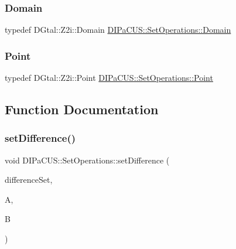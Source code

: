 \mbox{\label{namespaceDIPaCUS_1_1SetOperations_adf150e3c3201e8eb8b65d3d03b63df69}} 
\subsubsection{\texorpdfstring{Domain}{Domain}}
{\footnotesize\ttfamily typedef D\+Gtal\+::\+Z2i\+::\+Domain \hyperlink{namespaceDIPaCUS_1_1SetOperations_adf150e3c3201e8eb8b65d3d03b63df69}{D\+I\+Pa\+C\+U\+S\+::\+Set\+Operations\+::\+Domain}}

\mbox{\label{namespaceDIPaCUS_1_1SetOperations_aef7c8778c0d7fe3bb3d34608fdef58cc}} 
\subsubsection{\texorpdfstring{Point}{Point}}
{\footnotesize\ttfamily typedef D\+Gtal\+::\+Z2i\+::\+Point \hyperlink{namespaceDIPaCUS_1_1SetOperations_aef7c8778c0d7fe3bb3d34608fdef58cc}{D\+I\+Pa\+C\+U\+S\+::\+Set\+Operations\+::\+Point}}



\subsection{Function Documentation}
\mbox{\label{namespaceDIPaCUS_1_1SetOperations_a1ac3bb89ed9eb839006dd5f4af4a2353}} 
\subsubsection{\texorpdfstring{set\+Difference()}{setDifference()}}
{\footnotesize\ttfamily void D\+I\+Pa\+C\+U\+S\+::\+Set\+Operations\+::set\+Difference (\begin{DoxyParamCaption}\item[{\hyperlink{namespaceDIPaCUS_1_1SetOperations_a66926bf2c0a8f9e0192373c76f1b75e1}{Digital\+Set} \&}]{difference\+Set,  }\item[{const \hyperlink{namespaceDIPaCUS_1_1SetOperations_a66926bf2c0a8f9e0192373c76f1b75e1}{Digital\+Set} \&}]{A,  }\item[{const \hyperlink{namespaceDIPaCUS_1_1SetOperations_a66926bf2c0a8f9e0192373c76f1b75e1}{Digital\+Set} \&}]{B }\end{DoxyParamCaption})}

